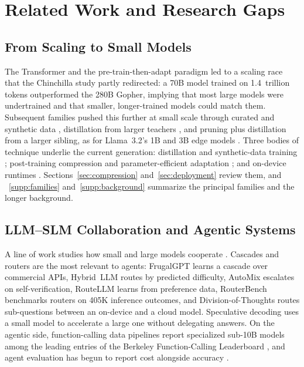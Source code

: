 \section{Related Work and Research Gaps}
\label{section:background}

\subsection{From Scaling to Small Models}
\label{subsec:background_evolution}
\label{subsec:background_techniques}
\label{subsec:background_families}

The Transformer \citep{vaswani2017attention} and the pre-train-then-adapt paradigm \citep{devlin2019bert,brown2020gpt3} led to a scaling race that the Chinchilla study \citep{hoffmann2022chinchilla} partly redirected: a 70B model trained on 1.4~trillion tokens outperformed the 280B Gopher, implying that most large models were undertrained and that smaller, longer-trained models could match them. Subsequent families pushed this further at small scale through curated and synthetic data \citep{gunasekar2023phi1,abdin2024phi3}, distillation from larger teachers \citep{gemma2024,team2025gemma3}, and pruning plus distillation from a larger sibling, as for Llama~3.2's 1B and 3B edge models \citep{meta2024llama32}. Three bodies of technique underlie the current generation: distillation and synthetic-data training \citep{hinton2015distilling,gunasekar2023phi1}; post-training compression and parameter-efficient adaptation \citep{frantar2023gptq,lin2024awq,hu2022lora,dettmers2023qlora}; and on-device runtimes \citep{gerganov2023llamacpp,meta2024executorch,mlc2024}. Sections~\ref{sec:compression} and~\ref{sec:deployment} review them, and \suppsec~\ref{supp:families} and~\ref{supp:background} summarize the principal families and the longer background.

\subsection{LLM--SLM Collaboration and Agentic Systems}
\label{subsec:background_collab}

A line of work studies how small and large models cooperate \citep{chen2024role_small,chen2025collab_survey}. Cascades and routers are the most relevant to agents: FrugalGPT \citep{chen2023frugalgpt} learns a cascade over commercial APIs, Hybrid~LLM \citep{ding2024hybridllm} routes by predicted difficulty, AutoMix \citep{aggarwal2024automix} escalates on self-verification, RouteLLM \citep{ong2024routellm} learns from preference data, RouterBench \citep{hu2024routerbench} benchmarks routers on 405K inference outcomes, and Division-of-Thoughts \citep{division_of_thoughts_2025} routes sub-questions between an on-device and a cloud model. Speculative decoding \citep{leviathan2023speculative,chen2023specsampling} uses a small model to accelerate a large one without delegating answers. On the agentic side, function-calling data pipelines report specialized sub-10B models among the leading entries of the Berkeley Function-Calling Leaderboard \citep{liu2024apigen,liu2025toolace,zhang2024xlam}, and agent evaluation has begun to report cost alongside accuracy \citep{kapoor2024agentsmatter,kapoor2025hal,erol2025costofpass}.

